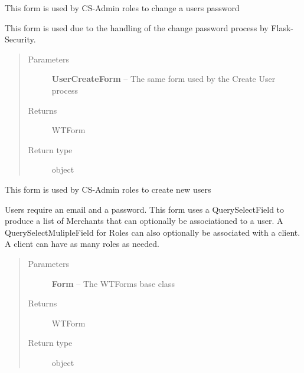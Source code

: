 \documentclass[letterpaper,10pt,english]{sphinxmanual}
\begin{document}

\begin{fulllineitems}
\label{dev-users:cagenix.users.forms.UserChangePasswordForm}
This form is used by CS-Admin roles to change a users password

This form is used due to the handling of the change password process by
Flask-Security.
\begin{quote}\begin{description}
\item[{Parameters}] \leavevmode
\textbf{UserCreateForm} -- The same form used by the Create User process

\item[{Returns}] \leavevmode
WTForm

\item[{Return type}] \leavevmode
object

\end{description}\end{quote}

\end{fulllineitems}


\begin{fulllineitems}
\label{dev-users:cagenix.users.forms.UserCreateForm}
This form is used by CS-Admin roles to create new users

Users require an email and a password. This form uses a QuerySelectField to
produce a list of Merchants that can optionally be associationed to a user.
A QuerySelectMulipleField for Roles can also optionally be associated with
a client. A client can have as many roles as needed.
\begin{quote}\begin{description}
\item[{Parameters}] \leavevmode
\textbf{Form} -- The WTForms base class

\item[{Returns}] \leavevmode
WTForm

\item[{Return type}] \leavevmode
object

\end{description}\end{quote}

\end{fulllineitems}
\end{document}
